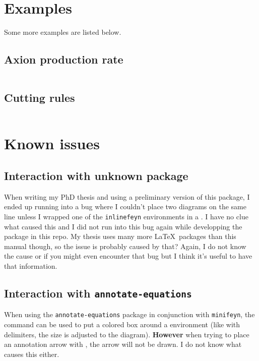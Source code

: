 \documentclass[11pt,a4paper]{article}
\begin{document}
\section{Examples}

Some more examples are listed below.

\subsection{Axion production rate}


\inputminted[bgcolor=Beige]{latex}{include/equation5.tex}

\subsection{Cutting rules}


\inputminted[bgcolor=Beige]{latex}{include/equation6.tex}

\section{Known issues}

\subsection{Interaction with unknown package}

When writing my PhD thesis and using a preliminary version of this package,
I ended up running into a bug where I couldn't place two diagrams on the same line unless I wrapped one of the \texttt{inlinefeyn} environments
in a \texttt{}.
I have no clue what caused this and I did not run into this bug again while developping the package in this repo.
My thesis uses many more \LaTeX~packages than this manual though, so the issue is probably caused by that?
Again, I do not know the cause or if you might even encounter that bug but I think it's useful to have that information.

\subsection{Interaction with \texttt{annotate-equations}}

When using the \texttt{annotate-equations} package in conjunction with \texttt{minifeyn},
the \texttt{\eqnmarkbox} command can be used to put a colored box around a \texttt{\inlinefeyn} environment
(like with delimiters, the size is adjusted to the diagram).
\textbf{However} when trying to place an annotation arrow with \texttt{\annotate}, the arrow will not be drawn.
I do not know what causes this either.
\end{document}
